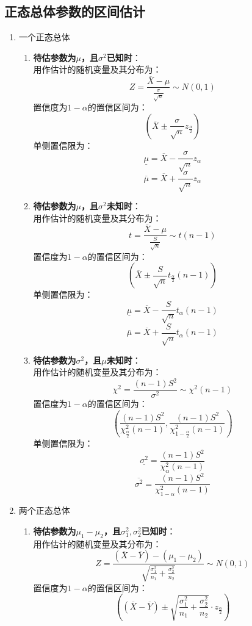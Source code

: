 \documentclass[12pt,a4paper,UTF8]{book}
\begin{document}
\subsection{正态总体参数的区间估计}
\begin{enumerate}
\item 一个正态总体
\begin{enumerate}
\item \textbf{待估参数为$\mu$，且$\sigma^2$已知时}：\\
用作估计的随机变量及其分布为：
\[Z=\frac{\overline{X}-\mu}{\frac{\sigma}{\sqrt{n}}}\sim N\left(0,1\right)\]
置信度为$1-\alpha$的置信区间为：
\[\left(\overline{X}\pm\frac{\sigma}{\sqrt{n}}z_{\frac{\alpha}{2}}\right)\]
单侧置信限为：
\[\underline{\mu}=\overline{X}-\frac{\sigma}{\sqrt{n}}z_{\alpha}\]
\[\overline{\mu}=\overline{X}+\frac{\sigma}{\sqrt{n}}z_{\alpha}\]
\item \textbf{待估参数为$\mu$，且$\sigma^2$未知时}：\\
用作估计的随机变量及其分布为：
\[t=\frac{\overline{X}-\mu}{\frac{S}{\sqrt{n}}}\sim t\left(n-1\right)\]
置信度为$1-\alpha$的置信区间为：
\[\left(\overline{X}\pm\frac{S}{\sqrt{n}}t_{\frac{\alpha}{2}}\left(n-1\right)\right)\]
单侧置信限为：
\[\underline{\mu}=\overline{X}-\frac{S}{\sqrt{n}}t_{\alpha}\left(n-1\right)\]
\[\overline{\mu}=\overline{X}+\frac{S}{\sqrt{n}}t_{\alpha}\left(n-1\right)\]
\item \textbf{待估参数为$\sigma^2$，且$\mu$未知时}：\\
用作估计的随机变量及其分布为：
\[\chi^2=\frac{\left(n-1\right)S^2}{\sigma^2}\sim\chi^2\left(n-1\right)\]
置信度为$1-\alpha$的置信区间为：
\[\left(\frac{\left(n-1\right)S^2}{\chi_{\frac{\alpha}{2}}^2\left(n-1\right)},\frac{\left(n-1\right)S^2}{\chi_{1-\frac{\alpha}{2}}^2\left(n-1\right)}\right)\]
单侧置信限为：
\[\underline{\sigma^2}=\frac{\left(n-1\right)S^2}{\chi_{\alpha}^2\left(n-1\right)}\]
\[\overline{\sigma^2}=\frac{\left(n-1\right)S^2}{\chi_{1-\alpha}^2\left(n-1\right)}\]
\end{enumerate}
\item 两个正态总体
\begin{enumerate}
\item \textbf{待估参数为$\mu_1-\mu_2$，且$\sigma_1^2,\sigma_2^2$已知时}：\\
用作估计的随机变量及其分布为：
\[Z=\frac{\left(\overline{X}-\overline{Y}\right)-\left(\mu_1-\mu_2\right)}{\sqrt{\frac{\sigma_1^2}{n_1}+\frac{\sigma_2^2}{n_2}}}\sim N\left(0,1\right)\]
置信度为$1-\alpha$的置信区间为：
\[\left(\left(\overline{X}-\overline{Y}\right)\pm\sqrt{\frac{\sigma_1^2}{n_1}+\frac{\sigma_2^2}{n_2}}\cdot z_{\frac{\alpha}{2}}\right)\]

\end{enumerate}
\end{enumerate}
\end{document}
